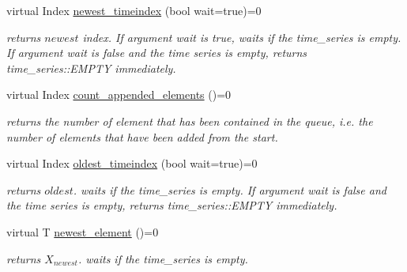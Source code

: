 \begin{DoxyCompactItemize}
\item 
\mbox{\label{classtime__series_1_1TimeSeriesInterface_a19127d715b58f95c0e2581576fe80f18}} 
virtual Index \hyperlink{classtime__series_1_1TimeSeriesInterface_a19127d715b58f95c0e2581576fe80f18}{newest\+\_\+timeindex} (bool wait=true)=0
\begin{DoxyCompactList}\small\item\em returns $ newest $ index. If argument wait is true, waits if the time\+\_\+series is empty. If argument wait is false and the time series is empty, returns time\+\_\+series\+::\+E\+M\+P\+TY immediately. \end{DoxyCompactList}\item 
\mbox{\label{classtime__series_1_1TimeSeriesInterface_a46cf7fc73adfcc400fbf40c22aa7268f}} 
virtual Index \hyperlink{classtime__series_1_1TimeSeriesInterface_a46cf7fc73adfcc400fbf40c22aa7268f}{count\+\_\+appended\+\_\+elements} ()=0
\begin{DoxyCompactList}\small\item\em returns the number of element that has been contained in the queue, i.\+e. the number of elements that have been added from the start. \end{DoxyCompactList}\item 
\mbox{\label{classtime__series_1_1TimeSeriesInterface_a3a68de9ecf8bfeb6c05ea89386537307}} 
virtual Index \hyperlink{classtime__series_1_1TimeSeriesInterface_a3a68de9ecf8bfeb6c05ea89386537307}{oldest\+\_\+timeindex} (bool wait=true)=0
\begin{DoxyCompactList}\small\item\em returns $ oldest $. waits if the time\+\_\+series is empty. If argument wait is false and the time series is empty, returns time\+\_\+series\+::\+E\+M\+P\+TY immediately. \end{DoxyCompactList}\item 
\mbox{\label{classtime__series_1_1TimeSeriesInterface_ad3b66b6b5f0f763d440731c50e41b4cb}} 
virtual T \hyperlink{classtime__series_1_1TimeSeriesInterface_ad3b66b6b5f0f763d440731c50e41b4cb}{newest\+\_\+element} ()=0
\begin{DoxyCompactList}\small\item\em returns $ X_{newest} $. waits if the time\+\_\+series is empty. \end{DoxyCompactList}\item 

\end{DoxyCompactItemize}
